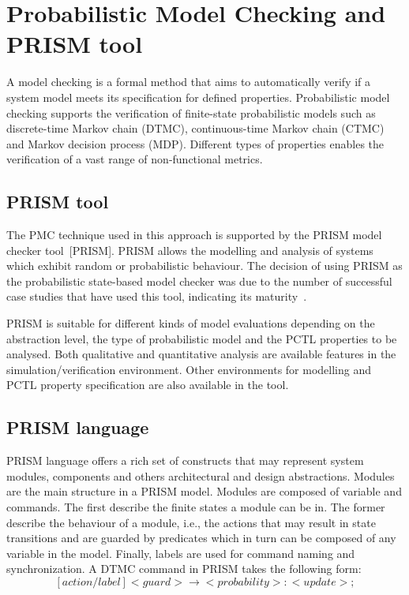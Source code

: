 \section{Probabilistic Model Checking and PRISM tool}

A model checking is a formal method that aims to automatically verify if a system model meets its specification for defined properties. Probabilistic model checking supports the verification of finite-state probabilistic models such as discrete-time Markov chain (DTMC), continuous-time Markov chain (CTMC) and Markov decision process (MDP). Different types of properties enables the verification of a vast range of non-functional metrics.

\subsection{PRISM tool}

The PMC technique used in this approach is supported by the PRISM model checker tool~[PRISM]. PRISM allows the modelling and analysis of systems which exhibit random or probabilistic behaviour. The decision of using PRISM as the probabilistic state-based model checker was due to the number of successful case studies that have used this tool, indicating its maturity~\cite{PRISM:pubs}.


PRISM is suitable for different kinds of model evaluations depending on the abstraction level, the type of probabilistic model and the PCTL properties to be analysed. Both qualitative and quantitative analysis are available features in the simulation/verification environment. Other environments for modelling and PCTL property specification are also available in the tool.
  
\subsection{PRISM language}

PRISM language offers a rich set of constructs that may represent system modules, components and others architectural and design abstractions. Modules are the main structure in a PRISM model. Modules are composed of variable and commands. The first describe the finite states a module can be in. The former describe the behaviour of a module, i.e., the actions that may result in state transitions and are guarded by predicates which in turn can be composed of any variable in the model. Finally, labels are used for command naming and synchronization. A DTMC command in PRISM takes the following form: $$[action/label]<guard>\to<probability>:<update>;$$

